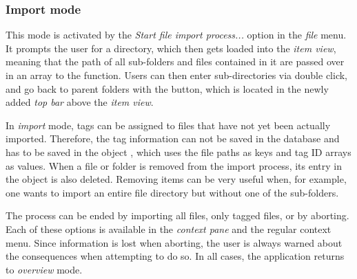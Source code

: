 \subsubsection{Import mode}

This mode is activated by the \emph{Start file import process...} option in the \emph{file} menu. It prompts the user for a directory, which then gets loaded into the \emph{item view}, meaning that the path of all sub-folders and files contained in it are passed over in an array to the  function. Users can then enter sub-directories via double click, and go back to parent folders with the \tfcode{^} button, which is located in the newly added \emph{top bar} above the \emph{item view}.

In \emph{import} mode, tags can be assigned to files that have not yet been actually imported. Therefore, the tag information can not be saved in the database and has to be saved in the object , which uses the file paths as keys and tag ID arrays as values. When a file or folder is removed from the import process, its entry in the object is also deleted. Removing items can be very useful when, for example, one wants to import an entire file directory but without one of the sub-folders.

The process can be ended by importing all files, only tagged files, or by aborting. Each of these options is available in the \emph{context pane} and the regular context menu. Since information is lost when aborting, the user is always warned about the consequences when attempting to do so. In all cases, the application returns to \emph{overview} mode.
